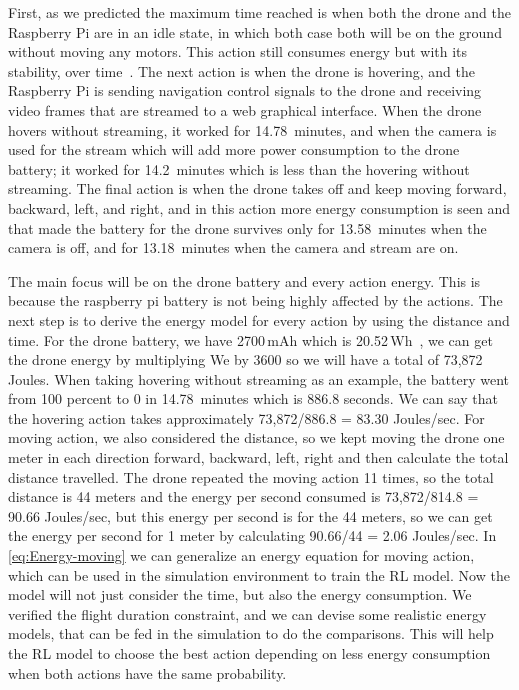 \documentclass[../main.tex]{subfiles}
\begin{document}
First, as we predicted 
the maximum time reached is when both the drone and 
the Raspberry Pi are in an idle state, in which both case both will 
be on the ground without moving any motors.
This action still consumes energy but with 
its stability, over time~\cite{Abey18}. 
The next action is when the drone is hovering, and 
the Raspberry Pi is sending navigation control 
signals to the drone and receiving video frames 
that are streamed to a web graphical interface. 
When the drone hovers without streaming, it worked 
for \SI{14.78}{minutes}, and when the camera is used for 
the stream which will add more power consumption to 
the drone battery; it worked for \SI{14.2}{minutes} which 
is less than the hovering without streaming. The final 
action is when the drone takes off and keep moving 
forward, backward, left, and right, and in this action 
more energy consumption is seen and that made the 
battery for the drone survives only for \SI{13.58}{minutes}
when the camera is off, and for \SI{13.18}{minutes} 
when the camera and stream are on.

The main focus will be on the drone battery and every 
action energy. This is because the raspberry pi battery 
is not being highly affected by the actions. 
The next step is to derive the energy model for every 
action by using the distance and time. For the drone battery, 
we have 2700\,mAh which is 20.52\,Wh~\cite{Par19}, 
we can get the drone energy by multiplying We by 3600 
so we will have a total of 73,872 Joules. When taking
hovering without streaming as an example, the battery 
went from 100 percent to 0 in \SI{14.78}{minutes} which is 
886.8 seconds. We can say that the hovering action takes 
approximately 73,872/886.8 = 83.30 Joules/sec. 
For moving action,
we also considered the distance, so we kept 
moving the drone one meter in each direction 
{forward, backward, left, right} and then calculate 
the total distance travelled. The drone repeated 
the moving action 11 times, so the total distance 
is 44 meters and the energy per second consumed 
is 73,872/814.8 = 90.66 Joules/sec, but this energy 
per second is for the 44 meters, so we can get the 
energy per second for 1 meter by calculating 
90.66/44 = 2.06 Joules/sec. 
In \cref{eq:Energy-moving} we can generalize an energy 
equation for moving action, which can be used in the simulation 
environment to train the RL model. Now the model will not 
just consider the time, but also the energy consumption.
We verified the flight duration constraint, and we can devise some 
realistic energy models, that can be fed in the simulation 
to do the comparisons. This will help the RL model to choose 
the best action depending on less energy consumption 
when both actions have the same probability. 
\end{document}
